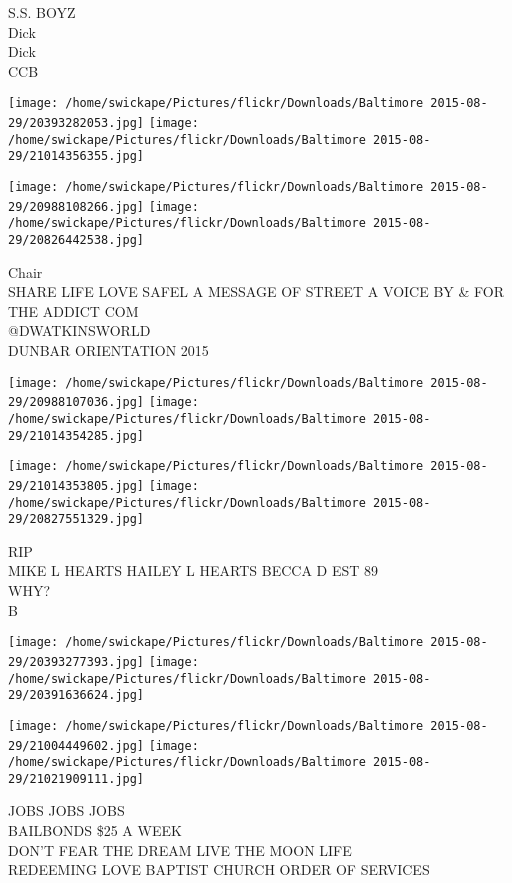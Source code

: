 \documentclass[10pt,letterpaper]{article}
\begin{document}
S.S. BOYZ\\
Dick\\
Dick\\
CCB\\
\pagebreak

\texttt{[image: /home/swickape/Pictures/flickr/Downloads/Baltimore 2015-08-29/20393282053.jpg]}
\texttt{[image: /home/swickape/Pictures/flickr/Downloads/Baltimore 2015-08-29/21014356355.jpg]}

\texttt{[image: /home/swickape/Pictures/flickr/Downloads/Baltimore 2015-08-29/20988108266.jpg]}
\texttt{[image: /home/swickape/Pictures/flickr/Downloads/Baltimore 2015-08-29/20826442538.jpg]}

Chair\\
SHARE LIFE LOVE SAFEL A MESSAGE OF STREET A VOICE BY \& FOR THE ADDICT COM\\
@DWATKINSWORLD\\
DUNBAR ORIENTATION 2015\\
\pagebreak

\texttt{[image: /home/swickape/Pictures/flickr/Downloads/Baltimore 2015-08-29/20988107036.jpg]}
\texttt{[image: /home/swickape/Pictures/flickr/Downloads/Baltimore 2015-08-29/21014354285.jpg]}

\texttt{[image: /home/swickape/Pictures/flickr/Downloads/Baltimore 2015-08-29/21014353805.jpg]}
\texttt{[image: /home/swickape/Pictures/flickr/Downloads/Baltimore 2015-08-29/20827551329.jpg]}

RIP\\
MIKE L HEARTS HAILEY L HEARTS BECCA D EST 89\\
WHY?\\
B\\
\pagebreak

\texttt{[image: /home/swickape/Pictures/flickr/Downloads/Baltimore 2015-08-29/20393277393.jpg]}
\texttt{[image: /home/swickape/Pictures/flickr/Downloads/Baltimore 2015-08-29/20391636624.jpg]}

\texttt{[image: /home/swickape/Pictures/flickr/Downloads/Baltimore 2015-08-29/21004449602.jpg]}
\texttt{[image: /home/swickape/Pictures/flickr/Downloads/Baltimore 2015-08-29/21021909111.jpg]}

JOBS JOBS JOBS\\
BAILBONDS \$25 A WEEK\\
DON'T FEAR THE DREAM LIVE THE MOON LIFE\\
REDEEMING LOVE BAPTIST CHURCH ORDER OF SERVICES\\
\pagebreak
\end{document}
